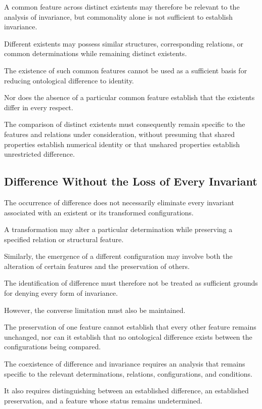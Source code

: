 A common feature across distinct existents
may therefore be relevant to the analysis
of invariance, but commonality alone is
not sufficient to establish invariance.

Different existents may possess similar
structures, corresponding relations, or
common determinations while remaining
distinct existents.

The existence of such common features
cannot be used as a sufficient basis
for reducing ontological difference
to identity.

Nor does the absence of a particular
common feature establish that the
existents differ in every respect.

The comparison of distinct existents
must consequently remain specific to
the features and relations under
consideration, without presuming that
shared properties establish numerical
identity or that unshared properties
establish unrestricted difference.

\subsection{Difference Without the Loss of Every Invariant}

The occurrence of difference does not
necessarily eliminate every invariant
associated with an existent or its
transformed configurations.

A transformation may alter a particular
determination while preserving a specified
relation or structural feature.

Similarly, the emergence of a different
configuration may involve both the
alteration of certain features and
the preservation of others.

The identification of difference must
therefore not be treated as sufficient
grounds for denying every form of
invariance.

However, the converse limitation must
also be maintained.

The preservation of one feature cannot
establish that every other feature
remains unchanged, nor can it establish
that no ontological difference exists
between the configurations being compared.

The coexistence of difference and
invariance requires an analysis that
remains specific to the relevant
determinations, relations, configurations,
and conditions.

It also requires distinguishing between
an established difference, an established
preservation, and a feature whose status
remains undetermined.

